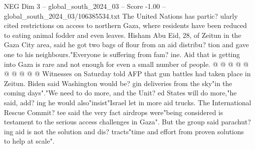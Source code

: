 \begin{textsample}{NEG Dim 3 – global\_south\_2024\_03 – Score -1.00 – global\_south\_2024\_03/106385534.txt}
The United Nations has partic? ularly cited restrictions on access to northern Gaza, where residents have been reduced to eating animal fodder and even leaves.
Hisham Abu Eid, 28, of Zeitun in the Gaza City area, said he got two bags of flour from an aid distribu? tion and gave one to his neighbours."Everyone is suffering from fam? ine.
Aid that is getting into Gaza is rare and not enough for even a small number of people. @ @ @ @ @ @ @ @ @ @ Witnesses on Saturday told AFP that gun battles had taken place in Zeitun.
Biden said Washington would be? gin deliveries from the sky"in the coming days"."We need to do more, and the Unit? ed States will do more,"he said, add? ing he would also"insist"Israel let in more aid trucks.
The International Rescue Commit? tee said the very fact airdrops were"being considered is testament to the serious access challenges in Gaza".
But the group said parachut? ing aid is not the solution and dis? tracts"time and effort from proven solutions to help at scale".

\end{textsample}
